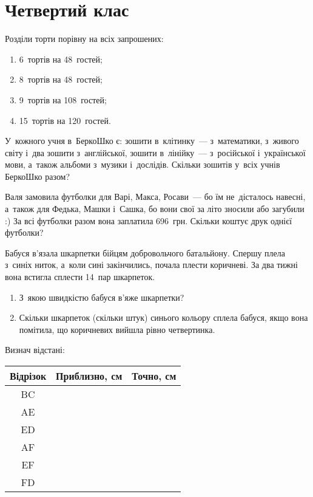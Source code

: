 \chapter{Четвертий клас}

\problem
Розділи торти порівну на всіх запрошених:
\begin{enumerate}
    \item 6~тортів на 48~гостей;
    \item 8~тортів на 48~гостей;
    \item 9~тортів на 108~гостей;
    \item 15~тортів на 120~гостей.
\end{enumerate}


\problem
У~кожного учня в~БеркоШко є: зошити в~клітинку~--- з~математики,
з~живого світу і~два зошити з~англійської, зошити в~лінійку~--- 
з~російської і~української мови, а~також альбоми з~музики і~дослідів.
Скільки зошитів у~всіх учнів БеркоШко разом?


\problem
Валя замовила футболки для Варі, Макса, Росави~--- бо їм не~дісталось навесні,
а~також для Федька, Машки і~Сашка, бо вони свої за літо зносили або загубили :)
За всі футболки разом вона заплатила 696~грн.
Скільки коштує друк однієї футболки? 


\problem
Бабуся в’язала шкарпетки бійцям добровольчого батальйону.
Спершу плела з~синіх ниток, а~коли сині закінчились, почала плести коричневі.
За два тижні вона встигла сплести 14~пар шкарпеток.
\begin{enumerate}
    \item З~якою швидкістю бабуся в’яже шкарпетки? 
    \item Скільки шкарпеток (скільки штук) синього кольору сплела бабуся,
    якщо вона помітила, що коричневих вийшла рівно четвертинка.
\end{enumerate}


\problem
Визнач відстані:

\begin{tabular}{|c|c|c|}
    \hline
    Відрізок & Приблизно, см & Точно, см \\ \hline
    BC & & \\ \hline
    AE & & \\ \hline
    ED & & \\ \hline
    AF & & \\ \hline
    EF & & \\ \hline
    FD & & \\ \hline
\end{tabular}



